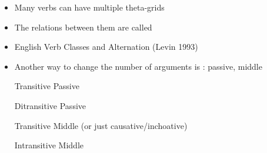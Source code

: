 \documentclass[headrule,footrule]{foils}
\begin{document}
\begin{itemize}
\item  Many verbs can have multiple theta-grids
  \begin{exe}
    \ex
    \begin{xlist}
      \ex {}
      \ex {}
      \ex {}
    \end{xlist}
    \ex
    \begin{xlist}
      \ex {}
      \ex {}
    \end{xlist}
  \end{exe}  
\item  The relations between them are called 
\item  English Verb Classes and Alternation (Levin 1993)
\end{itemize}



\begin{itemize}
\item  Another way to change the number of arguments is 
: passive, middle
\begin{exe}
  \ex Transitive Passive
  \begin{xlist}
    \ex {}
    \ex {}
  \end{xlist}
  \ex Ditransitive Passive
  \begin{xlist}
    \ex {}
    \ex {}
  \end{xlist}
  \ex Transitive Middle (or just causative/inchoative)
  \begin{xlist}
    \ex {}
    \ex {}
  \end{xlist}
  \ex Intransitive Middle
  \begin{xlist}
    \ex {}
    \ex {}
  \end{xlist}
\end{exe}
\end{itemize}
\end{document}
